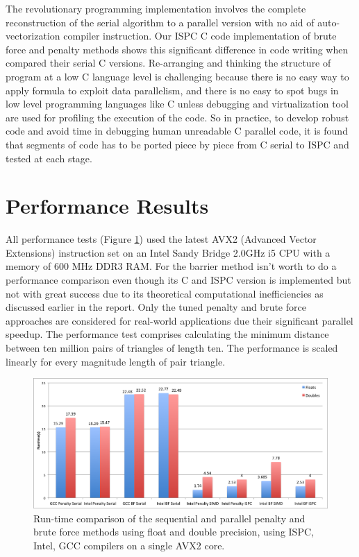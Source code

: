 \documentclass[times,12pt]{ACME2015article}
\begin{document}
The revolutionary programming implementation involves the complete reconstruction of the serial algorithm to a parallel version with no aid of auto-vectorization compiler instruction. Our ISPC C code implementation of brute force and penalty methods shows this significant difference in code writing when compared their serial C versions. Re-arranging and thinking the structure of program at a low C language level is challenging because there is no easy way to apply formula to exploit data parallelism, and there is no easy to spot bugs in low level programming languages like C unless debugging and virtualization tool are used for profiling the execution of the code. So in practice, to develop robust code and avoid time in debugging human unreadable C parallel code, it is found that  segments of code has to be ported piece by piece from C serial to ISPC and tested at each stage.


\section{Performance Results}
All performance tests (Figure \ref{fig17}) used the latest AVX2 (Advanced Vector Extensions) instruction set on an Intel Sandy Bridge 2.0GHz i5 CPU with a memory of 600 MHz DDR3 RAM. For the barrier method isn't worth to do a performance comparison even though its C and ISPC version is implemented but not with great success due to its theoretical computational inefficiencies as discussed earlier in the report. Only the tuned penalty and brute force approaches are considered for real-world applications due their significant parallel speedup. The performance test comprises calculating the minimum distance between ten million pairs of triangles of length ten. The performance is scaled linearly for every magnitude length of pair triangle. 

\begin{figure}[!h]
\centering
\includegraphics[width=1\textwidth]{perf} \protect\caption{\label{fig17}Run-time comparison of the sequential and parallel penalty and brute force methods using float and double precision, using ISPC, Intel, GCC compilers on a single AVX2 core.}
\end{figure} 
\end{document}
